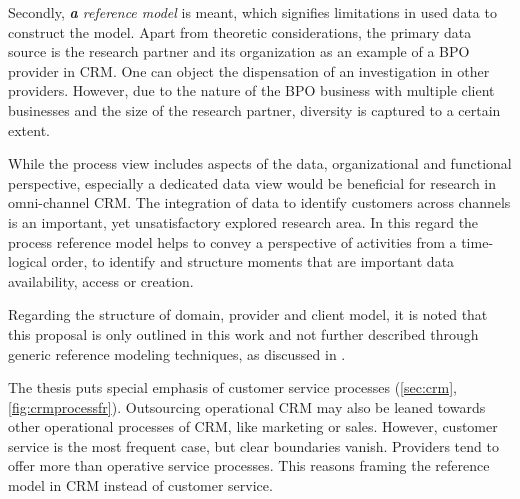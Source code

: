 Secondly, \textit{\textbf{a} reference model} is meant, which signifies limitations in used data to construct the model. Apart from theoretic considerations, the primary data source is the research partner and its organization as an example of a BPO provider in CRM. One can object the dispensation of an investigation in other providers. However, due to the nature of the BPO business with multiple client businesses and the size of the research partner, diversity is captured to a certain extent. 

While the process view includes aspects of the data, organizational and functional perspective, especially a dedicated data view would be beneficial for research in omni-channel \acrshort{CRM}. The integration of data to identify customers across channels is an important, yet unsatisfactory explored research area. In this regard the process reference model helps to convey a perspective of activities from a time-logical order, to identify and structure moments that are important \wrt data availability, access or creation. 

Regarding the structure of domain, provider and client model, it is noted that this proposal is only outlined in this work and not further described through generic reference modeling techniques, as discussed in \cite{delfmann2006adaptive, brocke2003referenzmodellierung}. 

The thesis puts special emphasis of customer service processes (\cf \ref{sec:crm},  \Fig \ref{fig:crmprocessfr}). Outsourcing operational \acrshort{CRM} may also be leaned towards other operational processes of CRM, like marketing or sales. However, customer service is the most frequent case, but clear boundaries vanish. Providers tend to offer more than operative service processes. This reasons framing the reference model in \acrshort{CRM} instead of customer service. 



